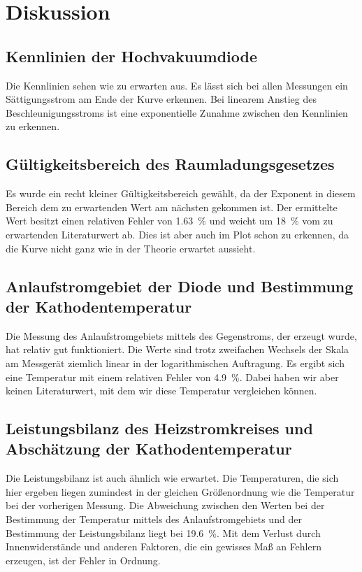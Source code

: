 \section{Diskussion}
\label{sec:Diskussion}

\subsection{Kennlinien der Hochvakuumdiode}
Die Kennlinien sehen wie zu erwarten aus. Es lässt sich bei allen Messungen ein Sättigungsstrom am Ende der Kurve erkennen. Bei linearem Anstieg des Beschleunigungsstroms ist eine exponentielle Zunahme zwischen den Kennlinien zu erkennen. %

\subsection{Gültigkeitsbereich des Raumladungsgesetzes}
Es wurde ein recht kleiner Gültigkeitsbereich gewählt, da der Exponent in diesem Bereich dem zu erwartenden Wert am nächsten gekommen ist. 
Der ermittelte Wert besitzt einen relativen Fehler von \SI{1.63}{\percent} und weicht um \SI{18}{\percent} vom zu erwartenden Literaturwert ab. 
Dies ist aber auch im Plot schon zu erkennen, da die Kurve nicht ganz wie in der Theorie erwartet aussieht. 

\subsection{Anlaufstromgebiet der Diode und Bestimmung der Kathodentemperatur}
Die Messung des Anlaufstromgebiets mittels des Gegenstroms, der erzeugt wurde, hat relativ gut funktioniert. Die Werte sind trotz zweifachen Wechsels der Skala am Messgerät ziemlich linear in der logarithmischen Auftragung. Es ergibt sich eine Temperatur mit einem relativen Fehler von \SI{4.9}{\percent}. Dabei haben wir aber keinen Literaturwert, mit dem wir diese Temperatur vergleichen können. %

\subsection{Leistungsbilanz des Heizstromkreises und Abschätzung der Kathodentemperatur}
Die Leistungsbilanz ist auch ähnlich wie erwartet. Die Temperaturen, die sich hier ergeben liegen zumindest in der gleichen Größenordnung wie die Temperatur bei der vorherigen Messung. Die Abweichung zwischen den Werten bei der Bestimmung der Temperatur mittels des Anlaufstromgebiets und der Bestimmung der Leistungsbilanz liegt bei \SI{19.6}{\percent}. Mit dem Verlust durch Innenwiderstände und anderen Faktoren, die ein gewisses Maß an Fehlern erzeugen, ist der Fehler in Ordnung. %

